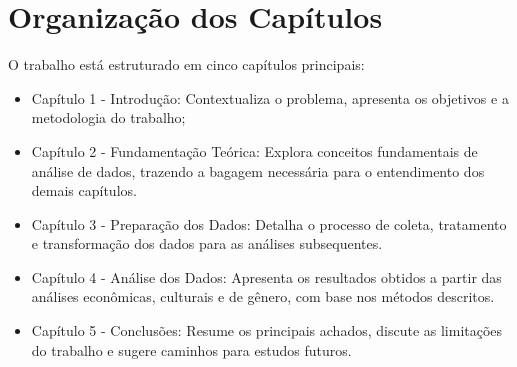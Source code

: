 \section{Organização dos Capítulos}
O trabalho está estruturado em cinco capítulos principais:

\begin{itemize}
\item Capítulo 1 - Introdução: Contextualiza o problema, apresenta os objetivos e a metodologia do trabalho;

\item Capítulo 2 - Fundamentação Teórica: Explora conceitos fundamentais de análise de dados, trazendo a bagagem necessária para o entendimento dos demais capítulos.

\item Capítulo 3 - Preparação dos Dados: Detalha o processo de coleta, tratamento e transformação dos dados para as análises subsequentes.

\item Capítulo 4 - Análise dos Dados: Apresenta os resultados obtidos a partir das análises econômicas, culturais e de gênero, com base nos métodos descritos.

\item Capítulo 5 - Conclusões: Resume os principais achados, discute as limitações do trabalho e sugere caminhos para estudos futuros.

\end{itemize}